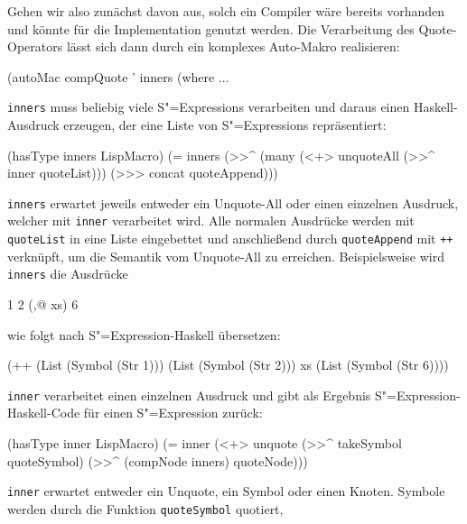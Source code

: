 \documentclass[11pt, a4paper, bibgerm]{scrbook}
\newenvironment{DIFnomarkup}{}{}
\newcommand\icode[1]{\lstinline?#1?}
\newcommand{\sexp}{S"=Expression}
\newcommand{\sexps}{S"=Expressions}
\begin{document}
Gehen wir also zunächst davon aus, solch ein Compiler wäre bereits
vorhanden und könnte für die Implementation genutzt werden. Die
Verarbeitung des Quote-Operators lässt sich dann durch ein komplexes
Auto-Makro realisieren:
\begin{DIFnomarkup}\begin{code}
(autoMac compQuote ' inners
  (where
    ...
\end{code}\end{DIFnomarkup}
\icode{inners} muss beliebig viele \sexps{} verarbeiten und daraus einen
Haskell-Ausdruck erzeugen, der eine Liste von \sexps{}
repräsentiert:
\begin{DIFnomarkup}\begin{code}
    (hasType inners LispMacro)
    (= inners
       (>>^ (many (<+> unquoteAll 
                       (>>^ inner quoteList)))
            (>>> concat quoteAppend)))
\end{code}\end{DIFnomarkup}
\icode{inners} erwartet jeweils entweder ein Unquote-All oder einen
einzelnen Ausdruck, welcher mit \icode{inner} verarbeitet wird. Alle
normalen Ausdrücke werden mit \icode{quoteList} in eine Liste
eingebettet und anschließend durch \icode{quoteAppend} mit \icode{++}
verknüpft, um die Semantik vom Unquote-All zu erreichen. Beispielsweise
wird \icode{inners} die Ausdrücke 
\begin{DIFnomarkup}\begin{code}
1 2 (,@ xs) 6  
\end{code}\end{DIFnomarkup}
wie folgt nach \sexp{}-Haskell übersetzen:
\begin{DIFnomarkup}\begin{code}
(++ (List (Symbol (Str 1)))
    (List (Symbol (Str 2)))
    xs    
    (List (Symbol (Str 6))))
\end{code}\end{DIFnomarkup}
\icode{inner} verarbeitet einen einzelnen Ausdruck und gibt als Ergebnis
\sexp{}-Haskell-Code für einen \sexp{} zurück:
\begin{DIFnomarkup}\begin{code}
    (hasType inner LispMacro)
    (= inner (<+> unquote    
                  (>>^ takeSymbol quoteSymbol)     
                  (>>^ (compNode inners) quoteNode)))
\end{code}\end{DIFnomarkup}
\icode{inner} erwartet entweder ein Unquote, ein Symbol oder einen
Knoten. Symbole werden durch die Funktion \icode{quoteSymbol} quotiert,
\end{document}
